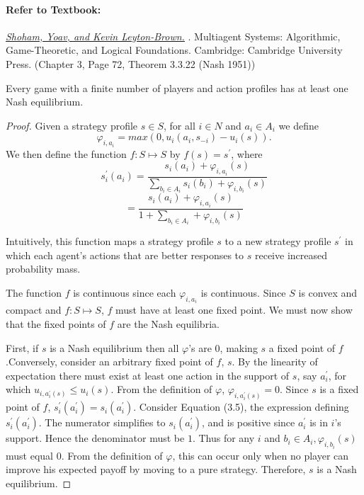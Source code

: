 \documentclass[runningheads]{llncs}
\begin{document}
\paragraph{Refer to Textbook:} 
\href{http://www.masfoundations.org/mas.pdf}{\textit{\underline{Shoham, Yoav, and Kevin Leyton-Brown.}}} \citeyear{shoham2008multiagent}. Multiagent Systems: Algorithmic, Game-Theoretic, and Logical Foundations. Cambridge: Cambridge University Press. (Chapter 3, Page 72, Theorem 3.3.22 (Nash 1951))
\begin{theorem}
Every game with a finite number of players and
action profiles has at least one Nash equilibrium.
\end{theorem}
\begin{proof}
Given a strategy profile $s \in S$, for all $i \in N$ and $a_i \in A_i$ we define $$ \varphi_{i,a_i} = max{(0,u_i(a_i, s_{-i}) - u_i(s))}. $$
We then define the function $f : S \mapsto S$ by $f(s) = s^\prime$, where
 $$s_i^\prime(a_i)=\frac{s_i(a_i)+\varphi_{i,a_i}(s)}{\sum_{b_i\in A_i}s_i(b_i)+\varphi_{i,b_i}(s)} $$
$$ = \frac{s_i(a_i)+\varphi_{i,a_i}(s)}{1+\sum_{b_i\in A_i}+\varphi_{i,b_i}(s)}$$

Intuitively, this function maps a strategy profile $s$ to a new strategy profile $s^\prime$
in which each agent’s actions that are better responses to $s$ receive increased probability mass.
\par
The function $f$ is continuous since each $\varphi_{i,a_i}$ is continuous. Since $S$ is convex and compact and $f : S \mapsto S$, $f$ must have at least
one fixed point. We must now show that the fixed points of $f$ are the Nash
equilibria.
\par
First, if $s$ is a Nash equilibrium then all $\varphi$’s are $0$, making $s$ a fixed point of $f$.Conversely, consider an arbitrary fixed point of $f$, $s$. By the linearity of expectation
there must exist at least one action in the support of $s$, say $a_i^\prime$, for
which $u_{i,a_i^\prime(s)} \leq u_i(s)$. From the definition of $\varphi$, $\varphi_{i,a_i^\prime(s)}=0$. Since $s$ is a fixed point of $f$, $s_i^\prime(a_i^\prime)=s_i(a_i^\prime)$. Consider Equation (3.5), the expression
defining $s_i^\prime(a_i^\prime)$. The numerator simplifies to $s_i(a_i^\prime)$, and is positive since
$a_i^\prime$ is in $i$’s support. Hence the denominator must be $1$. Thus for any $i$ and
$b_i\in A_i,\varphi_{i,b_i}(s)$ must equal $0$. From the definition of $\varphi$, this can occur only
when no player can improve his expected payoff by moving to a pure strategy.
Therefore, $s$ is a Nash equilibrium.
\end{proof}
\end{document}
